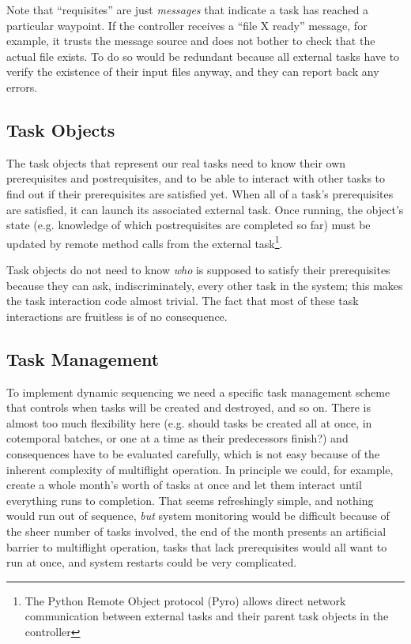 \documentclass[11pt,a4paper]{report}
\begin{document}
Note that ``requisites'' are just {\em messages} that indicate a task
has reached a particular waypoint.  If the controller receives a ``file
X ready'' message, for example, it trusts the message source and does
not bother to check that the actual file exists. To do so would be
redundant because all external tasks have to verify the existence of
their input files anyway, and they can report back any errors.


\subsection{Task Objects}

The task objects that represent our real tasks need to know their own
prerequisites and postrequisites, and to be able to interact with other
tasks to find out if their prerequisites are satisfied yet. When all of
a task's prerequisites are satisfied, it can launch its associated
external task. Once running, the object's state (e.g. knowledge of which
postrequisites are completed so far) must be updated by remote method
calls from the external task\footnote{The Python Remote Object protocol
(Pyro) allows direct network communication between external tasks and
their parent task objects in the controller}. 

Task objects do not need to know {\em who} is supposed to satisfy their
prerequisites because they can ask, indiscriminately, every other task
in the system; this makes the task interaction code almost trivial. The
fact that most of these task interactions are fruitless is of no
consequence. 

\subsection{Task Management}

To implement dynamic sequencing we need a specific task management
scheme that controls when tasks will be created and destroyed, and so
on. There is almost too much flexibility here (e.g.  should tasks be
created all at once, in cotemporal batches, or one at a time as their
predecessors finish?) and consequences have to be evaluated carefully,
which is not easy because of the inherent complexity of multiflight
operation. In principle we could, for example, create a whole month's
worth of tasks at once and let them interact until everything runs to
completion. That seems refreshingly simple, and nothing would run out of
sequence, {\em but} system monitoring would be difficult because of the
sheer number of tasks involved, the end of the month presents an
artificial barrier to multiflight operation, tasks that lack
prerequisites would all want to run at once, and system restarts could
be very complicated. 
\end{document}
